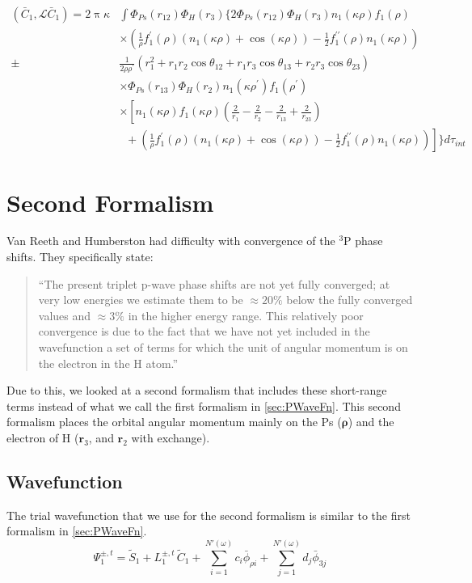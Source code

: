 \documentclass[Dissertation.tex]{subfiles}
\begin{document}
\begin{align}
\label{eq:PWaveCBarCBar}
\nonumber \left(\bar{C}_1,\mathcal{L}\bar{C}_1\right) = 2 \uppi \kappa & \int \Phi_{Ps}(r_{12}) \Phi_H(r_3) \Bigg\{ 2 \Phi_{Ps}(r_{12}) \Phi_H(r_3) n_1(\kappa\rho) f_1(\rho) \\
\nonumber & \times \left(\frac{1}{\rho} f_1^\prime(\rho) \left(n_1(\kappa\rho) + \cos(\kappa\rho)\right) - \frac{1}{2} f_1^{\prime\prime}(\rho) n_1(\kappa\rho)\right) \\
\nonumber \pm & \frac{1}{2\rho\rho^\prime} (r_1^2 + r_1 r_2 \cos\theta_{12} + r_1 r_3 \cos\theta_{13} + r_2 r_3 \cos\theta_{23}) \\
\nonumber & \times \Phi_{Ps}(r_{13}) \Phi_H(r_2) n_1(\kappa\rho^\prime) f_1(\rho^\prime) \\
\nonumber & \times \left[ n_1(\kappa\rho) f_1(\kappa\rho) \left(\frac{2}{r_1} - \frac{2}{r_2} - \frac{2}{r_{13}} + \frac{2}{r_{23}} \right) \right. \\
& \; \; + \left. \left(\frac{1}{\rho} f_1^\prime(\rho) \left(n_1(\kappa\rho) + \cos(\kappa\rho)\right) - \frac{1}{2} f_1^{\prime\prime}(\rho)  n_1(\kappa\rho)\right) \right]\Bigg\} d\tau_{int}
\end{align}


\section{Second Formalism}
\label{sec:PWave2Formalism}

Van Reeth and Humberston \cite{VanReeth2004} had difficulty with convergence 
of the $^3$P phase shifts. They specifically state:
\begin{quote}
``The present triplet p-wave phase shifts are not yet fully converged; at very 
low energies we estimate them to be $\approx 20\%$ below the fully converged 
values and $\approx 3\%$ in the higher energy range. This relatively poor 
convergence is due to the fact that we have not yet included in the 
wavefunction a set of terms for which the unit of angular momentum is on the 
electron in the H atom.''
\end{quote}
Due to this, we looked at a second formalism that includes these short-range 
terms instead of what we call the first formalism in \cref{sec:PWaveFn}. This
second formalism places the orbital angular momentum mainly on the Ps
($\bm{\rho}$) and the electron of H ($\bm{r}_3$, and $\bm{r}_2$ with exchange).

\subsection{Wavefunction}
The trial wavefunction that we use for the second formalism is similar to the
first formalism in \cref{sec:PWaveFn}.
\begin{equation}
\Psi_1^{\pm,t} = \widetilde{S}_1 + L_1^{\pm,t} \, \widetilde{C}_1 + \sum_{i=1}^{N'(\omega)} c_i \bar{\phi}_{\rho i} + \sum_{j=1}^{N'(\omega)} d_j \bar{\phi}_{3j}
\label{eq:PWave2ndWavefn}
\end{equation}
\end{document}
